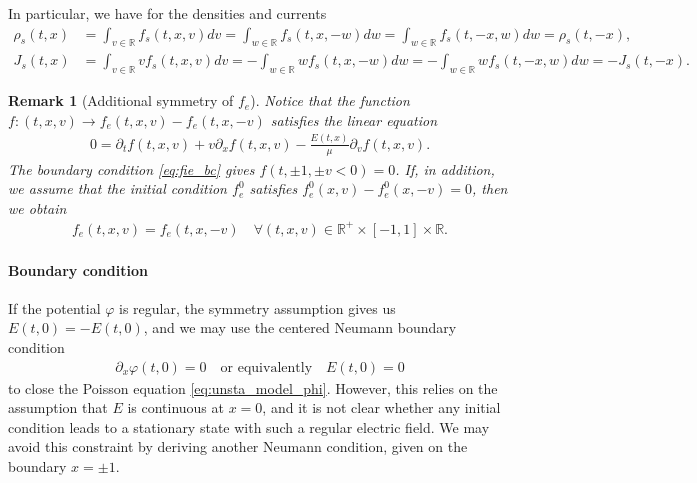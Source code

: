 \documentclass{article}
\newtheorem{remarque}{Remark}[section]
\numberwithin{equation}{section}
\newcommand{\R}{\mathbb{R}}
\newcommand{\vv}[1]{\begin{pmatrix} #1 \end{pmatrix}} %
\begin{document}
 In particular, we have for the densities and currents 
 \begin{align*}
 	\rho_s (t,x) &= \int_{v\in\mathbb{R}} f_s (t,x,v) dv =  \int_{w\in\mathbb{R}} f_s (t,x,-w) dw = \int_{w\in\mathbb{R}} f_s (t,-x,w) dw = \rho_s (t,-x),  \\ %
 	J_s (t,x) &= \int_{v\in\mathbb{R}} v f_s (t,x,v) dv =  - \int_{w\in\mathbb{R}} w f_s (t,x,-w) dw = - \int_{w\in\mathbb{R}} w f_s (t,-x,w) dw = - J_s (t,-x).
 \end{align*}
 
 \begin{remarque}[Additional symmetry of $f_e$] Notice that the function $f : (t,x,v) \to f_e(t,x,v) - f_e(t,x,-v)$ satisfies the linear equation 
 	 \begin{align*}
 	 	0 = \partial_t f (t,x,v) + v \partial_x f (t,x,v) - \frac{E(t,x)}{\mu} \partial_v f (t,x,v). %
 	 \end{align*}
 	 The boundary condition \cref{eq:fie_bc} gives $f(t,\pm 1, \pm v < 0) = 0$. If, in addition, we assume that the initial condition $f_e^0$ satisfies $f_e^0(x,v) - f_e^0(x,-v) = 0$, then we obtain 
 	 \begin{align}\label{eq:fe_sym_v}
 	 	f_e(t,x,v) = f_e(t,x,-v) \quad \forall (t,x,v) \in \R^+ \times [-1,1] \times \mathbb{R}.
 	 \end{align}
 \end{remarque}
 
 \paragraph{Boundary condition}
 
 If the potential $\varphi$ is regular, the symmetry assumption gives us $E(t,0) = - E(t,0)$, and we may use the centered Neumann boundary condition
 \begin{align}\label{eq:phi_bc_neumann}
 	\partial_x \varphi (t,0) = 0 \quad \text{or equivalently} \quad E(t,0) = 0
 \end{align}
 to close the Poisson equation \cref{eq:unsta_model_phi}. However, this relies on the assumption that $E$ is continuous at $x=0$, and it is not clear whether any initial condition leads to a stationary state with such a regular electric field. We may avoid this constraint by deriving another Neumann condition, given on the boundary $x=\pm 1$.
 
\end{document}
